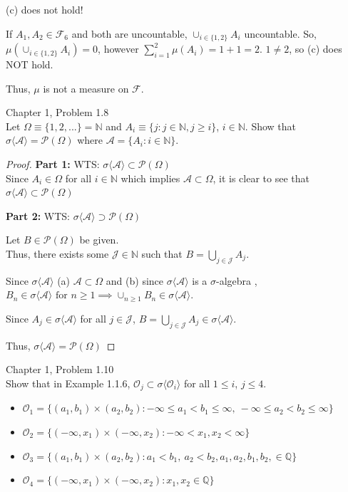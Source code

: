 \documentclass[12pt,letterpaper, onecolumn]{exam}
\newcommand{\nat}{\mathbb{N}}
\newcommand{\power}{\mathcal{P}}
\newcommand{\sigmaF}{\mathcal{F}}
\newcommand{\calA}{\mathcal{A}}
\newcommand{\calO}{\mathcal{O}}
\newcommand{\salg}{$\sigma$-algebra }
\newcommand{\gensig}[1]{\sigma\langle #1 \rangle} %
\newcommand{\rat}{\mathbb{Q}}
\begin{document}
\begin{questions}
\begin{solution}
\begin{enumerate}
        (c) does not hold!

        If $A_1, A_2 \in \sigmaF_6$ and both are uncountable, $\cup_{i \in \{1, 2\}} A_i$ uncountable. So, $\mu\left(\cup_{i \in \{1, 2\}} A_i\right) = 0$, however $\sum_{i=1}^2 \mu(A_i) = 1 + 1 = 2$. $1 \neq 2$, so (c) does NOT hold. 

        Thus, $\mu$ is not a measure on $\sigmaF$.
    \end{enumerate}
    \end{solution}

    \question Chapter 1, Problem 1.8 \\
    Let $\Omega \equiv \{1, 2,...\} = \nat$ and $A_i \equiv\{j : j \in \nat,j \geq i\}$, $i \in \nat$. Show that $\sigma \langle \calA\rangle  = \power(\Omega)$ where $\calA = \{A_i : i \in \nat\}$. 
    \begin{solution}
    \begin{proof}
        \textbf{Part 1:} WTS: $\gensig{\calA} \subset \power(\Omega)$ \\
        Since $A_i \in \Omega$ for all $i \in \nat$ which implies $\calA \subset \Omega$, it is clear to see that $\gensig{\calA} \subset \power(\Omega)$

        \textbf{Part 2:} WTS: $\gensig{\calA} \supset \power(\Omega)$

        Let $B \in \power(\Omega)$ be given. \\
        Thus, there exists some $\mathcal{J} \in \nat$ such that $B = \bigcup_{j \in \mathcal{J}} A_j$.

        Since $\gensig{\calA}$ (a) $\calA \subset \Omega$ and (b) since $\gensig{\calA}$ is a \salg, $B_n \in \gensig{\calA} \textrm{ for } n \geq 1 \implies \cup_{n \geq 1} B_n \in \gensig{\calA}$.

        Since $A_j \in \gensig{\calA}$ for all $j \in \mathcal{J}$,  $B = \bigcup_{j \in \mathcal{J}} A_j \in \gensig{\calA}$.

        Thus, $\gensig{\calA} = \power(\Omega)$
    \end{proof}        
    \end{solution}

    \question Chapter 1, Problem 1.10 \\
     Show that in Example 1.1.6, $\calO_j \subset \sigma \langle \calO_i\rangle $ for all $1 \leq i$, $j \leq 4$. 

     \begin{itemize}
         \item $\calO_1 = \{(a_1, b_1) \times (a_2, b_2): -\infty \leq a_1 < b_1 \leq \infty, \: -\infty \leq a_2 < b_2 \leq \infty\}$
         \item $\calO_2 = \{(-\infty, x_1) \times (-\infty, x_2): -\infty < x_1, x_2 < \infty\}$
         \item $\calO_3 = \{(a_1, b_1) \times (a_2, b_2): a_1 < b_1 , \: a_2 < b_2, a_1, a_2, b_1, b_2, \in \rat \}$
         \item $\calO_4 = \{(-\infty, x_1) \times (-\infty, x_2): x_1, x_2 \in \rat \}$
     \end{itemize}


\end{questions}
\end{document}

